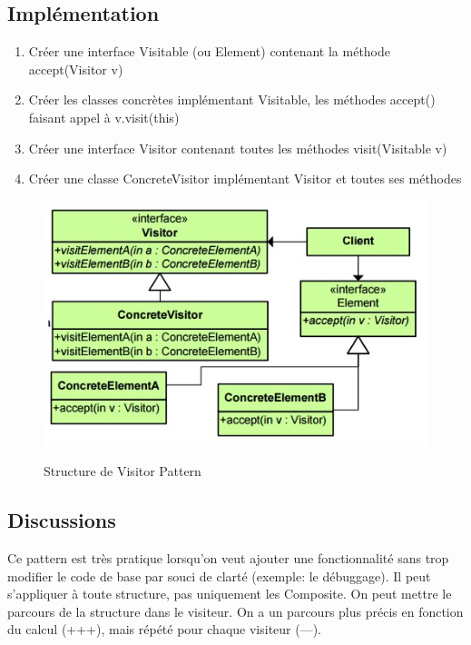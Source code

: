 \subsection{Implémentation}
\begin{enumerate}
    \item Créer une interface Visitable (ou Element) contenant la méthode accept(Visitor v)
    \item Créer les classes concrètes implémentant Visitable, les méthodes accept() faisant appel à v.visit(this)
    \item Créer une interface Visitor contenant toutes les méthodes visit(Visitable v)
    \item Créer une classe ConcreteVisitor implémentant Visitor et toutes ses méthodes

\end{enumerate}



\begin{figure}[!ht]
	\centering
	\begin{minipage}[t]{8.0cm}
		\includegraphics[scale=0.65]{Images/vis.jpg}
		\label{s1}
   		\caption{Structure de Visitor Pattern}
	\end{minipage}
	
\end{figure}


\subsection{Discussions}
Ce pattern est très pratique lorsqu’on veut ajouter une fonctionnalité sans trop modifier le code de base par souci de clarté (exemple: le débuggage). Il peut s'appliquer à toute structure, pas uniquement les Composite. On peut mettre le parcours de la structure dans le visiteur. On a un parcours plus précis en fonction du calcul (+++), mais répété pour chaque visiteur (---).

